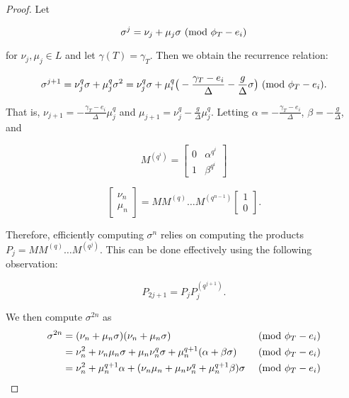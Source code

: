 \documentclass{acmart}
\theoremstyle{remark}
\numberwithin{equation}{section}
\begin{document}
\begin{proof}
Let 

\[ \sigma^j = \nu_j + \mu_j \sigma \textnormal{ (mod } \phi_{T} - e_i \textnormal{)}\]

\noindent for $\nu_j, \mu_j \in L$ and let $\gamma(T) = \gamma_T$. Then we obtain the recurrence relation:

\[\sigma^{j+1} = \nu_j^q \sigma + \mu_j^q \sigma^2 = \nu_j^q \sigma + \mu_i^q\big( -\frac{\gamma_T - e_i}{\Delta} - \frac{g}{\Delta} \sigma \big) \textnormal{ (mod } \phi_{T} - e_i \textnormal{)}. \]

\noindent That is, $\nu_{j+1} = -\frac{\gamma_T - e_i}{\Delta}\mu_{j}^q$ and $\mu_{j + 1} = \nu_j^q - \frac{g}{\Delta} \mu_j^q$. Letting $\alpha = -\frac{\gamma_T - e_i}{\Delta}$, $\beta = - \frac{g}{\Delta}$, and

\[ M^{(q^i)} = \begin{bmatrix} 0 & \alpha^{q^i} \\ 1 & \beta^{q^i} \end{bmatrix} \]

\[ \begin{bmatrix} \nu_{n} \\ \mu_n  \end{bmatrix} = M M^{(q)} \ldots M^{(q^{n-1})}  \begin{bmatrix} 1 \\ 0  \end{bmatrix}. \]


\noindent Therefore, efficiently computing $\sigma^n$ relies on computing the products $ P_j = M M^{(q)} \ldots M^{(q^j)}$. This can be done effectively using the following observation:

\[ P_{2j + 1} = P_{j} P_{j}^{(q^{j+1})}.\]

\noindent We then compute $\sigma^{2n}$ as
\begin{align*}
\sigma^{2n} & = (\nu_n + \mu_n \sigma)(\nu_n + \mu_n \sigma) & \textnormal{ (mod } \phi_{T} - e_i \textnormal{)} \\
 & = \nu_n^2 + \nu_n\mu_n \sigma + \mu_n\nu_n^q \sigma + \mu_n^{q+1} (\alpha + \beta \sigma) & \textnormal{ (mod } \phi_{T} - e_i \textnormal{)}\\
 & = \nu_n^2 + \mu_n^{q + 1} \alpha + (\nu_n \mu_n + \mu_n \nu_n^q + \mu_n^{q+1}\beta)\sigma & \textnormal{ (mod } \phi_{T} - e_i \textnormal{)}
\end{align*}


\end{proof}
\end{document}
